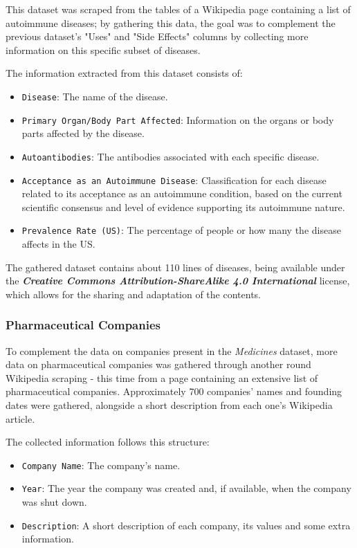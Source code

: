\documentclass[sigconf]{acmart}
\begin{document}
This dataset was scraped from the tables of a Wikipedia page containing a list of autoimmune diseases\cite{diseases_dataset}; by gathering this data, the goal was to complement the previous dataset's "Uses" and "Side Effects" columns by collecting more information on this specific subset of diseases.

The information extracted from this dataset consists of:
\begin{itemize}
	\item {\texttt{Disease}}: The name of the disease.
	\item {\texttt{Primary Organ/Body Part Affected}}: Information on the organs or body parts affected by the disease.
	\item {\texttt{Autoantibodies}}: The antibodies associated with each specific disease.
	\item {\texttt{Acceptance as an Autoimmune Disease}}: Classification for each disease related to its acceptance as an autoimmune condition, based on the current scientific consensus and level of evidence supporting its autoimmune nature.
	\item {\texttt{Prevalence Rate (US)}}: The percentage of people or how many the disease affects in the US.
\end{itemize}

The gathered dataset contains about 110 lines of diseases, being available under the \textit{\textbf{Creative Commons Attribution-ShareAlike 4.0 International}}\cite{wikipedia_cc} license, which allows for the sharing and adaptation of the contents.

\subsubsection{Pharmaceutical Companies}

To complement the data on companies present in the \textit{Medicines} dataset, more data on pharmaceutical companies was gathered through another round Wikipedia scraping - this time from a page containing an extensive list of pharmaceutical companies\cite{companies_dataset}. Approximately 700 companies' names and founding dates were gathered, alongside a short description from each one's Wikipedia article.

The collected information follows this structure:
\begin{itemize}
	\item {\texttt{Company Name}}: The company's name.
	\item {\texttt{Year}}: The year the company was created and, if available, when the company was shut down.
	\item {\texttt{Description}}: A short description of each company, its values and some extra information.
\end{itemize}
\end{document}
